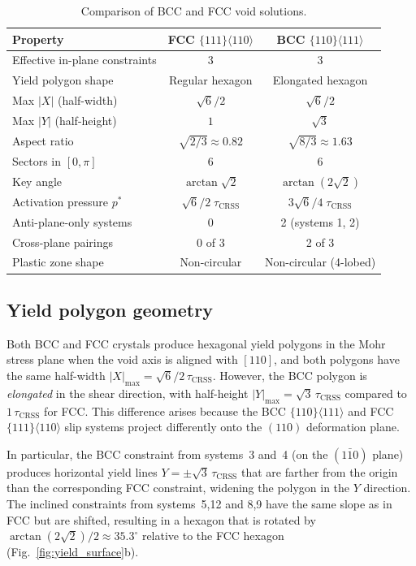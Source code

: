 \documentclass{svjour3} %
\newcommand{\tcrss}{\tau_{\mathrm{CRSS}}}
\begin{document}
\begin{table}[htb]
\caption{Comparison of BCC and FCC void solutions.}
\label{tab:comparison}
\centering
\begin{tabular}{lcc}
\toprule
Property & FCC $\{111\}\langle 110\rangle$ & BCC $\{110\}\langle 111\rangle$ \\
\midrule
Effective in-plane constraints & 3 & 3 \\
Yield polygon shape  & Regular hexagon & Elongated hexagon \\
Max $|X|$ (half-width) & $\sqrt{6}/2$ & $\sqrt{6}/2$ \\
Max $|Y|$ (half-height) & $1$ & $\sqrt{3}$ \\
Aspect ratio & $\sqrt{2/3} \approx 0.82$ & $\sqrt{8/3} \approx 1.63$ \\
Sectors in $[0,\pi]$ & 6 & 6 \\
Key angle & $\arctan\sqrt{2}$ & $\arctan(2\sqrt{2})$ \\
Activation pressure $p^*$ & $\sqrt{6}/2\;\tcrss$ & $3\sqrt{6}/4\;\tcrss$ \\
Anti-plane-only systems & 0 & 2 (systems 1, 2) \\
Cross-plane pairings & 0 of 3 & 2 of 3 \\
Plastic zone shape & Non-circular & Non-circular (4-lobed) \\
\bottomrule
\end{tabular}
\end{table}

\subsection{Yield polygon geometry}

Both BCC and FCC crystals produce hexagonal yield polygons in the Mohr
stress plane when the void axis is aligned with $[110]$, and both
polygons have the same half-width $|X|_{\max} = \sqrt{6}/2\,\tcrss$.
However, the BCC polygon is \emph{elongated} in the shear direction,
with half-height $|Y|_{\max} = \sqrt{3}\,\tcrss$ compared to
$1\,\tcrss$ for FCC. This difference arises because the BCC
$\{110\}\langle 111\rangle$ and FCC $\{111\}\langle 110\rangle$ slip
systems project differently onto the $(110)$ deformation plane.

In particular, the BCC constraint from systems~3 and~4 (on the
$(1\bar{1}0)$ plane) produces horizontal yield lines
$Y = \pm\sqrt{3}\,\tcrss$ that are farther from the origin than the
corresponding FCC constraint, widening the polygon in the $Y$ direction.
The inclined constraints from systems~5,12 and 8,9 have the same
slope as in FCC but are shifted, resulting in a hexagon that is rotated
by $\arctan(2\sqrt{2})/2 \approx 35.3^\circ$ relative to the FCC
hexagon (Fig.~\ref{fig:yield_surface}b).
\end{document}
